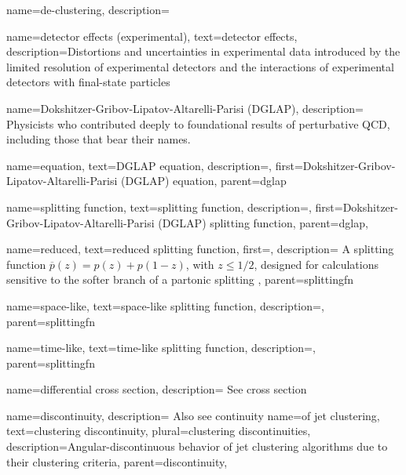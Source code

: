 {
    name=de-clustering,
    description={
    }
}



{
    name=detector effects (experimental),
    text=detector effects,
    description={Distortions and uncertainties in experimental data introduced by the limited resolution of experimental detectors and the interactions of experimental detectors with final-state particles}
}



{
    name=Dokshitzer-Gribov-Lipatov-Altarelli-Parisi (DGLAP),
    description={
        Physicists who contributed deeply to foundational results of perturbative QCD, including those that bear their names.
    }
}

    {
      name=equation,
      text=DGLAP equation,
      description={},
      first=Dokshitzer-Gribov-Lipatov-Altarelli-Parisi (DGLAP) equation,
      parent=dglap
    }

    {
      name=splitting function,
      text=splitting function,
      description={},
      first=Dokshitzer-Gribov-Lipatov-Altarelli-Parisi (DGLAP) splitting function,
      parent=dglap,
    }

        {
          name=reduced,
          text=reduced splitting function,
          first=,
          description={
            A splitting function \(\overline{p}(z) = p(z) + p(1-z)\), with \(z \leq 1/2\), designed for calculations sensitive to the softer branch of a partonic splitting
          },
          parent=splittingfn
        }

        {
          name=space-like,
          text=space-like splitting function,
          description={},
          parent=splittingfn
        }

        {
          name=time-like,
          text=time-like splitting function,
          description={},
          parent=splittingfn
        }



{
    name=differential cross section,
    description={
        See cross section
    }
}


{
    name=discontinuity,
    description={
        Also see continuity
    }
}
    {
        name=of jet clustering,
        text={clustering discontinuity},
        plural={clustering discontinuities},
        description={Angular-discontinuous behavior of jet clustering algorithms due to their clustering criteria},
        parent=discontinuity,
    }

